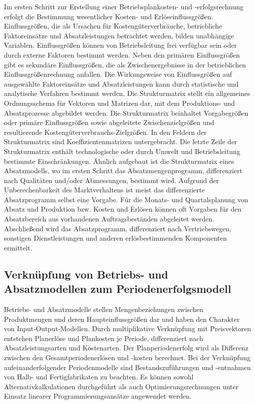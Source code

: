 Im ersten Schritt zur Erstellung einer Betriebsplankosten- und -erfolgsrechnung erfolgt die Bestimmung wesentlicher Kosten- und Erlöseinflussgrö{\ss}en. Einflussgrö{\ss}en, die als Ursachen für Kostengüterverbräuche, betriebliche Faktoreinsätze und Absatzleistungen betrachtet werden, bilden unabhängige Variablen. Einflussgrö{\ss}en können von Betriebsleitung frei verfügbar sein oder durch externe Faktoren bestimmt werden. Neben den primären Einflussgrö{\ss}en gibt es sekundäre Einflussgrö{\ss}en, die als Zwischenergebnisse in der betrieblichen Einflussgrö{\ss}enrechnung anfallen. Die Wirkungsweise von Einflussgrö{\ss}en auf ausgewählte Faktoreinsätze und Absatzleistungen kann durch statistische und analytische Verfahren bestimmt werden. Die Strukturmatrix stellt ein allgemeines Ordnungsschema für Vektoren und Matrizen dar, mit dem Produktions- und Absatzprozesse abgebildet werden. Die Strukturmatrix beinhaltet Vorgabegrö{\ss}en oder primäre Einflussgrö{\ss}en sowie abgeleitete Zwischenzielgrö{\ss}en und resultierende Kostengüterverbrauchs-Zielgrö{\ss}en. In den Feldern der Strukturmatrix sind Koeffizientenmatrizen untergebracht. Die letzte Zeile der Strukturmatrix enthält technologische oder durch Umwelt und Betriebsleitung bestimmte Einschränkungen. Ähnlich aufgebaut ist die Strukturmatrix eines Absatzmodells, wo im ersten Schritt das Absatzmengenprogramm, differenziert nach Qualitäten und/oder Abmessungen, bestimmt wird. Aufgrund der Unberechenbarkeit des Marktverhaltens ist meist das differenzierte Absatzprogramm selbst eine Vorgabe. Für die Monats- und Quartalsplanung von Absatz und Produktion bzw. Kosten und Erlösen können oft Vorgaben für den Absatzbereich aus vorhandenen Auftragsbeständen abgeleitet werden. Abschlie{\ss}end wird das Absatzprogramm, differenziert nach Vertriebswegen, sonstigen Dienstleistungen und anderen erlösbestimmenden Komponenten ermittelt.

\subsection{Verknüpfung von Betriebs- und Absatzmodellen zum Periodenerfolgsmodell}

Betriebs- und Absatzmodelle stellen Mengenbeziehungen zwischen Produktmengen und deren Haupteinflussgrö{\ss}en dar und haben den Charakter von Input-Output-Modellen. Durch multiplikative Verknüpfung mit Preisvektoren entstehen Planerlöse und Plankosten je Periode, differenziert nach Absatzleistungsarten und Kostenarten. Der Planperiodenerfolg wird als Differenz zwischen den Gesamtperiodenerlösen und -kosten berechnet. Bei der Verknüpfung aufeinanderfolgender Periodenmodelle sind Bestandszuführungen und -entnahmen von Halb- und Fertigfabrikaten zu beachten. Es können sowohl Alternativkalkulationen durchgeführt als auch Optimierungsrechnungen unter Einsatz linearer Programmierungsansätze angewendet werden.

